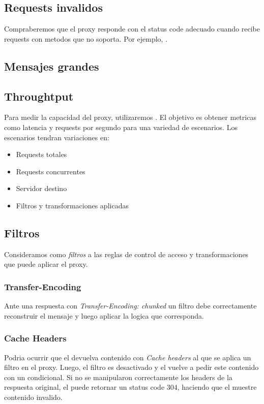 \documentclass[11pt,a4paper,titlepage]{article}
\begin{document}
\subsection{Requests invalidos}
Compraberemos que el proxy responde con el status code adecuado cuando recibe requests con metodos que no soporta.
Por ejemplo, .

\subsection{Mensajes grandes}

\subsection{Throughtput}
Para medir la capacidad del proxy, utilizaremos .
El objetivo es obtener metricas como latencia y requests por segundo para una variedad de escenarios.
Los escenarios tendran variaciones en: 
\begin{itemize}
    \item Requests totales
    \item Requests concurrentes
    \item Servidor destino
    \item Filtros y transformaciones aplicadas
\end{itemize}

\subsection{Filtros}
Consideramos como \textit{filtros} a las reglas de control de acceso y transformaciones que puede aplicar el proxy.

\subsubsection{Transfer-Encoding}
Ante una respuesta con \textit{Transfer-Encoding: chunked} un filtro debe correctamente reconstruir el mensaje y luego aplicar la logica que corresponda.

\subsubsection{Cache Headers}
Podria ocurrir que el \os devuelva contenido con \textit{Cache headers} al que se aplica un filtro en el proxy.
Luego, el filtro es desactivado y el \ua vuelve a pedir este contenido con un  condicional.
Si no se manipularon correctamente los headers de la respuesta original, el \os puede retornar un status code 304, haciendo que el \ua muestre contenido invalido.
\end{document}
